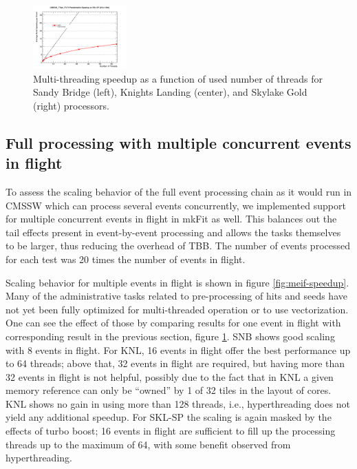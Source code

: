 \documentclass{webofc}
\def\mkfit{mkFit\xspace}
\def\threep{0.32\textwidth}
\def\postfigskip{\vskip-4mm}
\begin{document}
\begin{figure}[htb]
  \includegraphics[width=\threep]{figs/comp/SKL-SP_CMSSW_TTbar_PU70_TH_speedup.png}
  \postfigskip

  \caption{Multi-threading speedup as a function of used number of threads for Sandy
    Bridge (left), Knights Landing (center), and Skylake Gold (right) processors.}
  \label{fig:th-speedup}
\end{figure}


\subsection{Full processing with multiple concurrent events in flight}

To assess the scaling behavior of the full event processing chain as it would
run in CMSSW which can process several events concurrently, we implemented
support for multiple concurrent events in flight in \mkfit as well. This
balances out the tail effects present in event-by-event processing and allows
the tasks themselves to be larger, thus reducing the overhead of TBB. The 
number of events processed for each test was 20 times the number of events in 
flight. 

Scaling behavior for multiple events in flight is shown in figure
\ref{fig:meif-speedup}. Many of the administrative tasks related to
pre-processing of hits and seeds have not yet been fully optimized for
multi-threaded operation or to use vectorization. One can see the effect of
those by comparing results for one event in flight with corresponding result in
the previous section, figure \ref{fig:th-speedup}. SNB shows good scaling with 8
events in flight. For KNL, 16 events in flight offer the best performance up to
64 threads; above that, 32 events in flight are required, but having more than
32 events in flight is not helpful, possibly due to the fact that in KNL a given
memory reference can only be ``owned'' by 1 of 32 tiles in the layout of cores.
KNL shows no gain in using more than 128 threads, i.e., hyperthreading does not
yield any additional speedup. For SKL-SP the scaling is again masked by the
effects of turbo boost; 16 events in flight are sufficient to fill up the
processing threads up to the maximum of 64, with some benefit observed from
hyperthreading.
\end{document}
